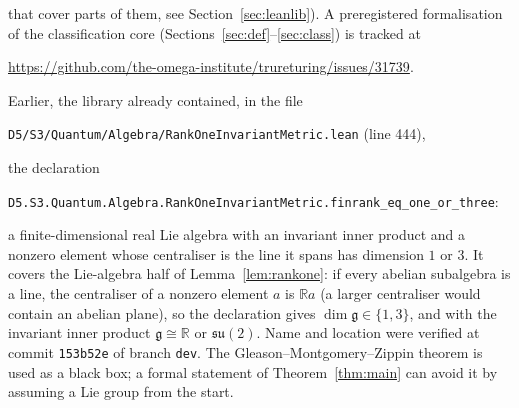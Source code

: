 \documentclass[11pt,reqno]{amsart}
\theoremstyle{definition}
\theoremstyle{remark}
\numberwithin{equation}{section}
\newcommand{\R}{\mathbb{R}}
\newcommand{\g}{\mathfrak{g}}
\newcommand{\su}{\mathfrak{su}}
\begin{document}
that cover parts of them, see Section~\ref{sec:leanlib}).  A preregistered formalisation of the classification core (Sections~\ref{sec:def}--\ref{sec:class}) is tracked at
\begin{center}\small\url{https://github.com/the-omega-institute/trureturing/issues/31739}.\end{center}
Earlier, the library already contained, in the file
\begin{center}\small\texttt{D5/S3/Quantum/Algebra/RankOneInvariantMetric.lean} (line 444),\end{center}
the declaration
\begin{center}\small\texttt{D5.S3.Quantum.Algebra.RankOneInvariantMetric.finrank\_eq\_one\_or\_three}:\end{center}
a finite-dimensional real Lie algebra with an invariant inner product and a nonzero element whose centraliser is the line it spans has
dimension $1$ or $3$.  It covers the Lie-algebra half of Lemma~\ref{lem:rankone}: if every abelian subalgebra is a
line, the centraliser of a nonzero element $a$ is $\R a$ (a larger centraliser would contain an abelian plane), so the
declaration gives $\dim\g\in\{1,3\}$, and with the invariant inner product $\g\cong\R$ or $\su(2)$.  Name and location
were verified at commit \texttt{153b52e} of branch \texttt{dev}.  The Gleason--Montgomery--Zippin theorem is used as a
black box; a formal statement of Theorem~\ref{thm:main} can avoid it by assuming a Lie group from the start.
\end{document}
